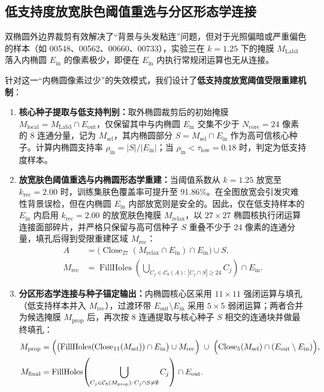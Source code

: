 \subsection{低支持度放宽肤色阈值重选与分区形态学连接}

双椭圆外边界裁剪有效解决了“背景与头发粘连”问题，但对于光照偏暗或严重偏色的样本（如 00548、00562、00660、00733），实验三在 $k=1.25$ 下的掩膜 $M_{\text{Lab3}}$ 落入内椭圆 $E_{\text{in}}$ 的像素极少，即便在 $E_{\text{in}}$ 内执行常规闭运算也无从连接。

针对这一“内椭圆像素过少”的失效模式，我们设计了\textbf{低支持度放宽阈值受限重建机制}：
\begin{enumerate}
\item \textbf{核心种子提取与低支持判别：}取外椭圆裁剪后的初始掩膜 $M_{\text{local}} = M_{\text{Lab3}} \cap E_{\text{out}}$，仅保留其中与内椭圆 $E_{\text{in}}$ 交集不少于 $N_{\text{core}}=24$ 像素的 8 连通分量，记为 $M_{\text{sel}}$，其内椭圆部分 $S = M_{\text{sel}} \cap E_{\text{in}}$ 作为高可信核心种子。计算内椭圆支持率 $\rho_{\text{in}} = |S| / |E_{\text{in}}|$；当 $\rho_{\text{in}} < \tau_{\text{low}} = 0.18$ 时，判定为低支持度样本。
\item \textbf{放宽肤色阈值重选与内椭圆形态学重建：}当阈值系数从 $k=1.25$ 放宽至 $k_{\text{rec}}=2.00$ 时，训练集肤色覆盖率可提升至 91.86\%。在全图放宽会引发灾难性背景误检，但在内椭圆 $E_{\text{in}}$ 内部放宽则是安全的。因此，仅在低支持样本的 $E_{\text{in}}$ 内启用 $k_{\text{rec}}=2.00$ 的放宽肤色掩膜 $M_{\text{relax}}$，以 $27\times27$ 椭圆核执行闭运算连接面部碎片，并严格只保留与高可信种子 $S$ 重叠不少于 24 像素的连通分量，填孔后得到受限重建区域 $M_{\text{rec}}$：
\begin{equation}
\begin{aligned}
A &= \bigl(\operatorname{Close}_{27}(M_{\text{relax}}\cap E_{\text{in}})\cap E_{\text{in}}\bigr)\cup S,\\
M_{\text{rec}} &= \operatorname{FillHoles}\!\left(\bigcup_{C_j\in\mathcal{C}_8(A):\,|C_j\cap S|\ge 24} C_j\right)\cap E_{\text{in}}.
\end{aligned}
\label{eq:lowsupport}
\end{equation}
\item \textbf{分区形态学连接与种子锚定输出：}内椭圆核心区采用 $11\times11$ 强闭运算与填孔（低支持样本并入 $M_{\text{rec}}$），过渡环带 $E_{\text{out}}\setminus E_{\text{in}}$ 采用 $5\times5$ 弱闭运算；两者合并为候选掩膜 $M_{\text{prop}}$ 后，再次按 8 连通提取与核心种子 $S$ 相交的连通块并做最终填孔：
\begin{equation}
\begin{aligned}
M_{\text{prop}} &= \Bigl(\bigl(\operatorname{FillHoles}(\operatorname{Close}_{11}(M_{\text{sel}}))\cap E_{\text{in}}\bigr)\cup M_{\text{rec}}\Bigr)
\;\cup\; \Bigl(\operatorname{Close}_{5}(M_{\text{sel}})\cap (E_{\text{out}}\setminus E_{\text{in}})\Bigr),\\
M_{\text{final}} &= \operatorname{FillHoles}\!\left(\bigcup_{C_j\in\mathcal{C}_8(M_{\text{prop}}):\,C_j\cap S\neq\emptyset} C_j\right)\cap E_{\text{out}}.
\end{aligned}
\label{eq:zonalmorph}
\end{equation}
\end{enumerate}

